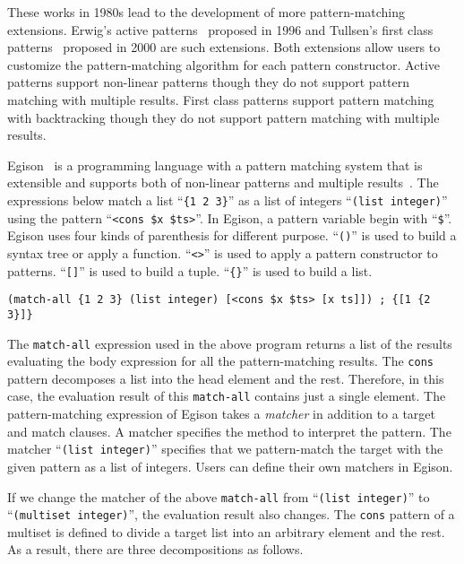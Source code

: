 \documentclass[acmlarge]{acmart}
\newcommand{\new}[1]{\textcolor{blue}{#1}}
\begin{document}
These works in 1980s lead to the development of more pattern-matching extensions.
Erwig's active patterns~\cite{erwig1996active} proposed in 1996 and Tullsen's first class patterns~\cite{tullsen2000first} proposed in 2000 are such extensions.
Both extensions allow users to customize the pattern-matching algorithm for each pattern constructor.
Active patterns support non-linear patterns though they do not support pattern matching with multiple results.
First class patterns support pattern matching with backtracking though they do not support pattern matching with multiple results.

Egison~\cite{egisonWeb} is a programming language with a pattern matching system that is extensible and supports both of non-linear patterns and multiple results~\cite{egi2018aplas}.
The expressions below match a list ``\texttt{\{1 2 3\}}'' as a list of integers ``\lstinline{(list integer)}'' using the pattern ``\lstinline{<cons $x $ts>}''.
In Egison, a pattern variable begin with ``\lstinline{$}''.
Egison uses four kinds of parenthesis for different purpose.
``\lstinline{()}'' is used to build a syntax tree or apply a function.
``\lstinline{<>}'' is used to apply a pattern constructor to patterns.
``\lstinline{[]}'' is used to build a tuple.
``\texttt{\{\}}'' is used to build a list. %

\begin{lstlisting}[language=egison]
(match-all {1 2 3} (list integer) [<cons $x $ts> [x ts]]) ; {[1 {2 3}]}
\end{lstlisting}

\noindent
The \lstinline{match-all} expression used in the above program returns a list of the results evaluating the body expression for all the pattern-matching results.
The \lstinline{cons} pattern decomposes a list into the head element and the rest.
Therefore, in this case, the evaluation result of this \lstinline{match-all} contains just a single element.
The pattern-matching expression of Egison takes a \emph{matcher} in addition to a target and match clauses.
A matcher specifies the method to interpret the pattern.
The matcher ``\lstinline{(list integer)}'' specifies that we pattern-match the target with the given pattern as a list of integers.
Users can define their own matchers in Egison.

If we change the matcher of the above \lstinline{match-all} from ``\lstinline{(list integer)}'' to ``\lstinline{(multiset integer)}'', the evaluation result also changes.
The \lstinline{cons} pattern of a multiset is defined to divide a target list into an arbitrary element and the rest.
As a result, there are three decompositions as follows.
\end{document}
